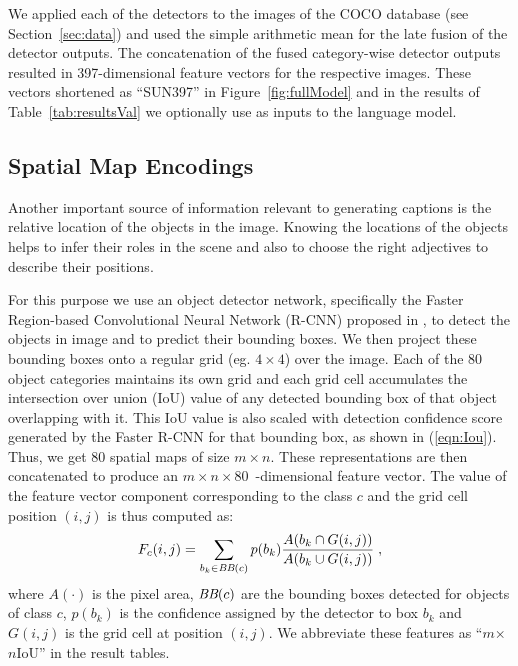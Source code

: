 We applied each of the detectors to the images of the COCO database
(see Section~\ref{sec:data}) and used the simple arithmetic mean for
the late fusion of the detector outputs.
The concatenation of the fused category-wise detector outputs resulted
in 397-dimensional feature vectors for the respective images.
These vectors shortened as ``SUN397'' in Figure~\ref{fig:fullModel}
and in the results of Table~\ref{tab:resultsVal} we
optionally use as inputs to the language model.

\subsection{Spatial Map Encodings}
Another important source of information relevant to generating
captions is the relative location of the objects in the image. 
Knowing the locations of the objects helps to infer their roles in the
scene and also to choose the right adjectives to describe their
positions.

For this purpose we use an object detector network, specifically the
Faster Region-based Convolutional Neural Network (R-CNN) proposed in
\cite{ren15fasterrcnn}, to detect the objects in image and to predict
their bounding boxes.
We then project these bounding boxes onto a regular grid (eg.\@
$4\times4$) over the image. 
Each of the 80 object categories maintains its own grid and each grid
cell accumulates the intersection over union (IoU) value of any
detected bounding box of that object overlapping with it.
This IoU value is also scaled with detection confidence score generated
by the Faster R-CNN for that bounding box, as shown in (\ref{eqn:Iou}).
Thus, we get 80 spatial maps of size $m\times n$. 
These representations are then concatenated to produce an $m\times
n\times80$~-dimensional feature vector.
The value of the feature vector component corresponding to the class
$c$ and the grid cell position $(i,j)$ is thus computed as:
\begin{equation}
  \label{eqn:Iou}
  F_c(i,j) = \sum_{b_k \in \text{\it BB}(c)}p(b_k)\frac{
    A(b_k \cap G(i,j))}{A(b_k \cup G(i,j))} \;,
\end{equation}
where $A(\cdot)$ is the pixel area, $\text{\it BB}(c)$ are the bounding
boxes detected for objects of class $c$, $p(b_k)$ is the confidence
assigned by the detector to box $b_k$ and $G(i,j)$ is the grid cell
at position $(i,j)$.
We abbreviate these features as ``$m$$\times${}$n$IoU'' in the result
tables.

